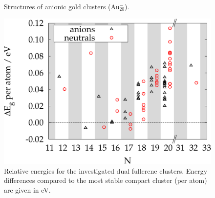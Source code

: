 \begin{figure}
\begin{center}
	\caption{Structures of anionic gold clusters (Au$_{20}^-$).}
	\label{fig:Au20-}
\end{center}
\end{figure} 

\begin{figure}[htbp]
\begin{center}
\includegraphics[width=.8\textwidth]{golddual/energies.pdf}
\caption{Relative energies for the investigated dual fullerene clusters.
Energy differences compared to the most stable compact cluster (per atom) are given in eV.}
\label{fig:AunMinus2}
\end{center}
\end{figure}

